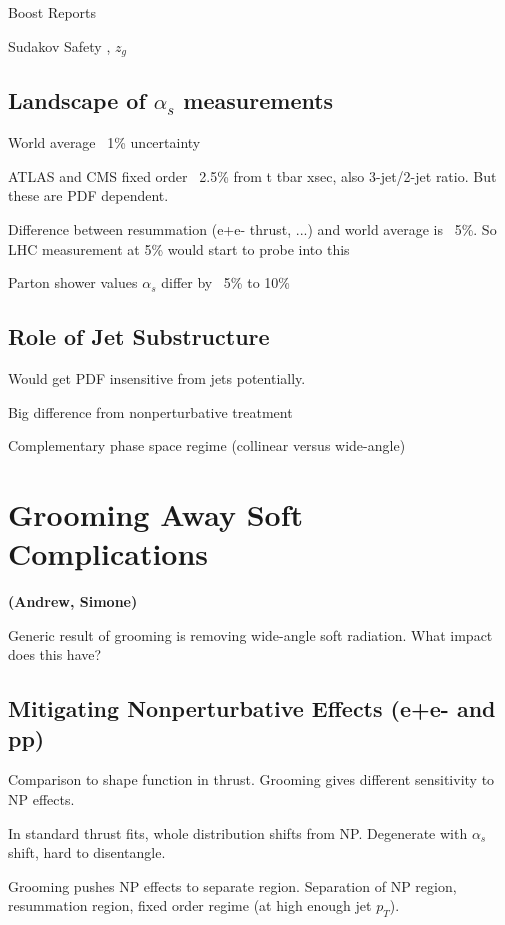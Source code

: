 \documentclass[11pt,letterpaper]{article}
\newcommand{\info}[1]{\textbf{\textcolor{mildred}{(#1)}}}
\begin{document}
Boost Reports \cite{Abdesselam:2010pt,Altheimer:2012mn,Altheimer:2013yza,Adams:2015hiv}

Sudakov Safety \cite{Larkoski:2013paa,Larkoski:2015lea}, $z_g$ \cite{Larkoski:2015lea}

\subsection{Landscape of $\alpha_s$ measurements}

World average ~1\% uncertainty

ATLAS and CMS fixed order ~2.5\% from t tbar xsec, also 3-jet/2-jet ratio.  But these are PDF dependent.

Difference between resummation (e+e- thrust, ...) and world average is ~5\%.  	So LHC measurement at 5\% would start to probe into this

Parton shower values $\alpha_s$ differ by ~5\% to 10\%


\subsection{Role of Jet Substructure}

	Would get PDF insensitive from jets potentially.
	
	Big difference from nonperturbative treatment

	Complementary phase space regime (collinear versus wide-angle)

\section{Grooming Away Soft Complications}
\label{sec:softcomplications}

\info{Andrew, Simone}


Generic result of grooming is removing wide-angle soft radiation.  What impact does this have?

\subsection{Mitigating Nonperturbative Effects (e+e- and pp)}

Comparison to shape function in thrust.  Grooming gives different sensitivity to NP effects.

In standard thrust fits, whole distribution shifts from NP.  Degenerate with $\alpha_s$ shift, hard to disentangle.

Grooming pushes NP effects to separate region.  Separation of NP region, resummation region, fixed order regime (at high enough jet $p_T$).
\end{document}
